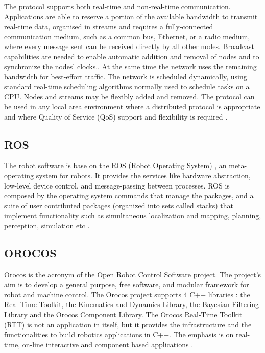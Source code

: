 \documentclass[conference]{IEEEtran}
\begin{document}
The protocol supports both real-time and non-real-time communication. Applications are able to reserve a portion of the available bandwidth to transmit real-time data, organised in streams and requires a fully-connected communication medium, such as a common bus, Ethernet, or a radio medium, where every message sent can be received directly by all other nodes. Broadcast capabilities are needed to enable automatic addition and removal of nodes and to synchronize the nodes' clocks.\cite{rtnet_1559870}. 
At the same time the network uses the remaining bandwidth for best-effort traffic. The network is scheduled dynamically, using standard real-time scheduling algorithms normally used to schedule tasks on a CPU.
Nodes and streams may be flexibly added and removed. The protocol can be used in any local area environment where a distributed protocol is appropriate and where Quality of Service (QoS) support and flexibility is required \cite{rtnet_Wulf03acompact}.

%
\subsection{ROS}\label{subsec:ros}
The robot software is base on the ROS (Robot Operating System) \cite{ros_components}, an meta-operating system for robots. It provides the services like hardware abstraction, low-level device control, and message-passing between processes.
ROS is composed by the operating system commands that manage the packages, and a suite of user contributed packages (organized into sets called stacks) that implement functionality such as simultaneous localization and mapping, planning, perception, simulation etc \cite{ros_gentle_introduction} \cite{ros_bmw_sticha}.

%
\subsection{OROCOS}\label{subsec:orocos}
Orocos \cite{orocos_Project_IEEE} is the acronym of the Open Robot Control Software project. The project's aim is to develop a general purpose, free software, and modular framework for robot and machine control. The Orocos project supports 4 C++ libraries \cite{orocos_manual}: the Real-Time Toolkit, the Kinematics and Dynamics Library, the Bayesian Filtering Library and the Orocos Component Library.
The Orocos Real-Time Toolkit (RTT) is not an application in itself, but it provides the infrastructure and the functionalities to build robotics applications in C++.
The emphasis is on real-time, on-line interactive and component based applications \cite{orocos_Cobem}.
\end{document}
